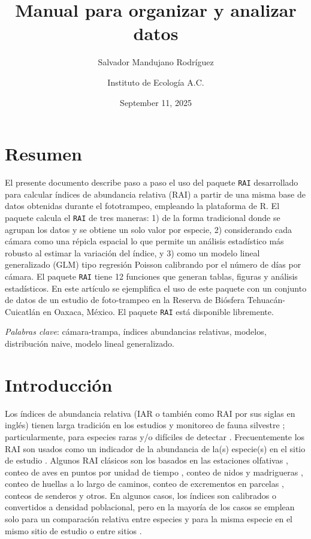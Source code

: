 \documentclass[
  10.5pt,
  a5paper]{book}
\title{Manual para organizar y analizar datos}
\author{Salvador Mandujano Rodríguez \and Instituto de Ecología A.C.}
\date{September 11, 2025}
\begin{document}
\maketitle

{
\setcounter{tocdepth}{3}
\tableofcontents
}
\listoffigures
\listoftables
{}
\chapter*{Resumen}\label{resumen}

El presente documento describe paso a paso el uso del paquete \texttt{RAI} desarrollado para calcular índices de abundancia relativa (RAI) a partir de una misma base de datos obtenidas durante el fototrampeo, empleando la plataforma de R. El paquete calcula el \texttt{RAI} de tres maneras: 1) de la forma tradicional donde se agrupan los datos y se obtiene un solo valor por especie, 2) considerando cada cámara como una répicla espacial lo que permite un análisis estadístico más robusto al estimar la variación del índice, y 3) como un modelo lineal generalizado (GLM) tipo regresión Poisson calibrando por el número de días por cámara. El paquete \texttt{RAI} tiene 12 funciones que generan tablas, figuras y análisis estadísticos. En este artículo se ejemplifica el uso de este paquete con un conjunto de datos de un estudio de foto-trampeo en la Reserva de Biósfera Tehuacán-Cuicatlán en Oaxaca, México. El paquete \texttt{RAI} está disponible libremente.

\emph{Palabras clave}: cámara-trampa, índices abundancias relativas, modelos, distribución naive, modelo lineal generalizado.

\pagebreak

\chapter{Introducción}\label{introducciuxf3n}

Los índices de abundancia relativa (IAR o también como RAI por sus siglas en inglés) tienen larga tradición en los estudios y monitoreo de fauna silvestre \citep{Delgado-Martinez2017}; particularmente, para especies raras y/o difíciles de detectar \citep{Raices2017}. Frecuentemente los RAI son usados como un indicador de la abundancia de la(s) especie(s) en el sitio de estudio \citep{effects2009}. Algunos RAI clásicos son los basados en las estaciones olfativas \citep{fegraus2011data}, conteo de aves en puntos por unidad de tiempo \citep{chao2014unifying}, conteo de nidos y madrigueras , conteo de huellas a lo largo de caminos, conteo de excrementos en parcelas \citep[\citet{chao2014unifying}]{chao2012coverage}, conteos de senderos \citep{hill1973diversity} y otros. En algunos casos, los índices son calibrados o convertidos a densidad poblacional, pero en la mayoría de los casos se emplean solo para un comparación relativa entre especies y para la misma especie en el mismo sitio de estudio o entre sitios \citep{hsieh2016inext}.
\end{document}
